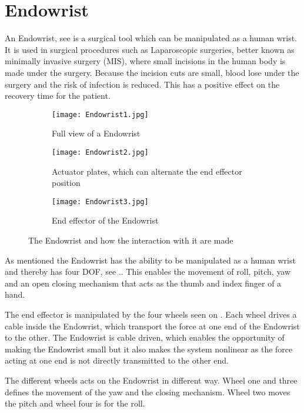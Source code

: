 \section{Endowrist}\label{sec:Endowrist}

An Endowrist, see  is a surgical tool which can be manipulated as a human wrist. It is used in surgical procedures such as Laparoscopic surgeries, better known as minimally invasive surgery (MIS), where small incisions in the human body is made under the surgery. Because the incision cuts are small, blood lose under the surgery and the risk of infection is reduced. This has a positive effect on the recovery time for the patient.


\begin{figure}[H]
	\centering
	\begin{subfigure}{.32\textwidth}
		\centering
		\texttt{[image: Endowrist1.jpg]}
		\caption{Full view of a Endowrist\vspace{8.5mm}   }
		\label{fig:Endo_full}
	\end{subfigure}
	\begin{subfigure}{.32\textwidth}
		\centering
		\texttt{[image: Endowrist2.jpg]}
		\caption{Actuator plates, which can alternate the end effector position}
		\label{fig:Endo_plates}
	\end{subfigure}
	\begin{subfigure}{.32\textwidth}
		\centering
		\texttt{[image: Endowrist3.jpg]}
		\caption{End effector of the Endowrist\newline}
		\label{fig:Endo_end}
	\end{subfigure}
\caption{The Endowrist and how the interaction with it are made}
\label{fig:endowrits_set}
\end{figure}

As mentioned the Endowrist has the ability to be manipulated as a human wrist and thereby has four \gls{DOF}, see .. This enables the movement of roll, pitch, yaw and an open closing mechanism that acts as the thumb and index finger of a hand. 

The end effector is manipulated by the four wheels seen on . Each wheel drives a cable inside the Endowrist, which transport the force at one end of the Endowrist to the other. The Endowrist is cable driven, which enables the opportunity of making the Endowrist small but it also makes the system nonlinear as the force acting at one end is not directly transmitted to the other end. 

The different wheels acts on the Endowrist in different way. Wheel one and three defines the movement of the yaw and the closing mechanism. Wheel two moves the pitch and wheel four is for the roll. 

